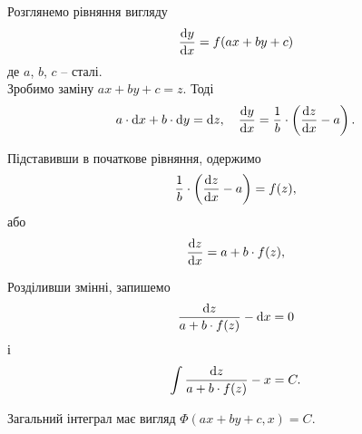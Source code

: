 Розглянемо рівняння вигляду
\begin{equation*}
	\frac{\mathop{}\!\mathrm{d} y}{\mathop{}\!\mathrm{d} x} = f(a x + b y + c)
\end{equation*}
де $a$, $b$, $c$ -- сталі. \\

Зробимо заміну $a x + b y + c = z$. Тоді 
\begin{equation*}
	a \cdot \mathop{}\!\mathrm{d} x + b \cdot \mathop{}\!\mathrm{d} y = \mathop{}\!\mathrm{d} z, \quad \frac{\mathop{}\!\mathrm{d} y}{\mathop{}\!\mathrm{d} x} = \frac1b \cdot \left( \frac{\mathop{}\!\mathrm{d} z}{\mathop{}\!\mathrm{d} x} - a \right).
\end{equation*}

Підставивши в початкове рівняння, одержимо
\begin{equation*}
	\frac1b \cdot \left( \frac{\mathop{}\!\mathrm{d} z}{\mathop{}\!\mathrm{d} x} - a \right) = f(z),
\end{equation*}
або
\begin{equation*}
	\frac{\mathop{}\!\mathrm{d} z}{\mathop{}\!\mathrm{d} x} = a + b \cdot f (z),
\end{equation*}

Розділивши змінні, запишемо
\begin{equation*}
	\frac{\mathop{}\!\mathrm{d} z}{a + b \cdot f (z)} - \mathop{}\!\mathrm{d} x = 0
\end{equation*}
і
\begin{equation*}
	\int \frac{\mathop{}\!\mathrm{d} z}{a + b \cdot f (z)} - x = C.
\end{equation*}

Загальний інтеграл має вигляд $\Phi(a x + b y + c, x) = C$.